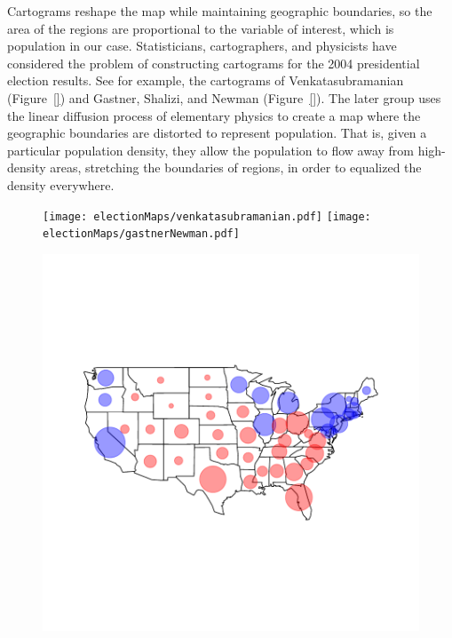 Cartograms reshape the map while maintaining geographic boundaries, 
so the area of the regions are proportional to the variable of interest, 
which is population in our case. 
Statisticians, cartographers, and physicists have considered the problem of 
constructing cartograms for the 2004 presidential election results. 
See for example, the cartograms of Venkatasubramanian (Figure~\ref{})
and Gastner, Shalizi, and Newman (Figure~\ref{}).
The later group uses the linear diffusion process of elementary physics to 
create a map where the geographic boundaries are distorted to represent population. 
That is, given a particular population density, they allow the population to 
flow away from high-density areas, stretching the boundaries of regions, in order
to equalized the density everywhere.


\begin{figure}
\texttt{[image: electionMaps/venkatasubramanian.pdf]}
\texttt{[image: electionMaps/gastnerNewman.pdf]}
\caption{}
\caption{}
\label{fig:cartograms}
\end{figure}

\begin{figure}
\includegraphics{electionMaps/stateCirclesRB.pdf}
\caption{}
\label{fig:stateCirclesRB}
\end{figure}

